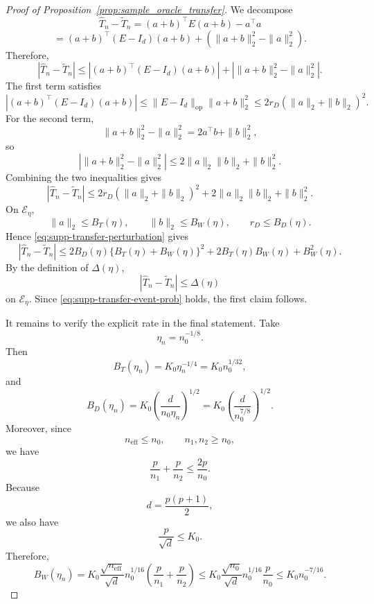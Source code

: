 \documentclass[
  12pt]{article}
\theoremstyle{plain}
\theoremstyle{definition}
\theoremstyle{remark}
\begin{document}
\begin{proof}[Proof of Proposition~\ref{prop:sample_oracle_transfer}]
We decompose
\[
\widehat T_n-\widetilde T_n
=
(a+b)^\top E(a+b)-a^\top a
\]
\[
=
(a+b)^\top(E-I_d)(a+b)
+
\left(
\|a+b\|_2^2-\|a\|_2^2
\right).
\]
Therefore,
\[
|\widehat T_n-\widetilde T_n|
\le
\left|
(a+b)^\top(E-I_d)(a+b)
\right|
+
\left|
\|a+b\|_2^2-\|a\|_2^2
\right|.
\]
The first term satisfies
\[
\left|
(a+b)^\top(E-I_d)(a+b)
\right|
\le
\|E-I_d\|_{\mathrm{op}}\|a+b\|_2^2
\le
2r_D(\|a\|_2+\|b\|_2)^2.
\]
For the second term,
\[
\|a+b\|_2^2-\|a\|_2^2
=
2a^\top b+\|b\|_2^2,
\]
so
\[
\left|
\|a+b\|_2^2-\|a\|_2^2
\right|
\le
2\|a\|_2\|b\|_2+\|b\|_2^2.
\]
Combining the two inequalities gives
\begin{equation}
\label{eq:supp-transfer-perturbation}
|\widehat T_n-\widetilde T_n|
\le
2r_D(\|a\|_2+\|b\|_2)^2
+
2\|a\|_2\|b\|_2
+
\|b\|_2^2.
\end{equation}
On \(\mathcal E_\eta\),
\[
\|a\|_2\le B_T(\eta),
\qquad
\|b\|_2\le B_W(\eta),
\qquad
r_D\le B_D(\eta).
\]
Hence \eqref{eq:supp-transfer-perturbation} gives
\[
|\widehat T_n-\widetilde T_n|
\le
2B_D(\eta)\{B_T(\eta)+B_W(\eta)\}^2
+
2B_T(\eta)B_W(\eta)
+
B_W^2(\eta).
\]
By the definition of \(\Delta(\eta)\),
\[
|\widehat T_n-\widetilde T_n|
\le
\Delta(\eta)
\]
on \(\mathcal E_\eta\). Since \eqref{eq:supp-transfer-event-prob} holds, the
first claim follows.

It remains to verify the explicit rate in the final statement. Take
\[
\eta_n=n_0^{-1/8}.
\]
Then
\[
B_T(\eta_n)
=
K_0\eta_n^{-1/4}
=
K_0 n_0^{1/32},
\]
and
\[
B_D(\eta_n)
=
K_0
\left(
\frac{d}{n_0\eta_n}
\right)^{1/2}
=
K_0
\left(
\frac{d}{n_0^{7/8}}
\right)^{1/2}.
\]
Moreover, since
\[
n_{\mathrm{eff}}\le n_0,
\qquad
n_1,n_2\ge n_0,
\]
we have
\[
\frac p{n_1}+\frac p{n_2}
\le
\frac{2p}{n_0}.
\]
Because
\[
d=\frac{p(p+1)}2,
\]
we also have
\[
\frac p{\sqrt d}\le K_0.
\]
Therefore,
\[
B_W(\eta_n)
=
K_0
\frac{\sqrt{n_{\mathrm{eff}}}}{\sqrt d}
n_0^{1/16}
\left(
\frac p{n_1}
+
\frac p{n_2}
\right)
\le
K_0
\frac{\sqrt{n_0}}{\sqrt d}
n_0^{1/16}
\frac p{n_0}
\le
K_0 n_0^{-7/16}.
\]


\end{proof}
\end{document}
